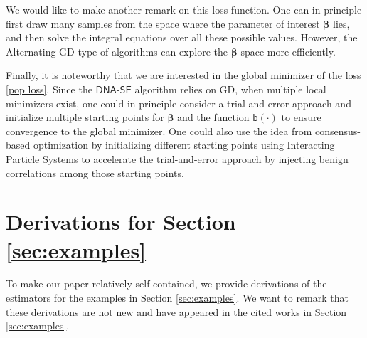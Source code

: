 \documentclass{article}
\def\dnase{{\mathsf{DNA\mbox{-}SE}}}
\def\sfb{\mathsf{b}}
\def\sfb{\mathsf{b}}
\theoremstyle{plain}
\theoremstyle{definition}
\theoremstyle{remark}
\def\bbeta{\boldsymbol{\beta}}
\begin{document}
We would like to make another remark on this loss function. One can in principle first draw many samples from the space where the parameter of interest $\bbeta$ lies, and then solve the integral equations over all these possible values. However, the Alternating GD type of algorithms can explore the $\bbeta$ space more efficiently.

Finally, it is noteworthy that we are interested in the global minimizer of the loss \eqref{pop loss}. Since the $\dnase$ algorithm relies on GD, when multiple local minimizers exist, one could in principle consider a trial-and-error approach and initialize multiple starting points for $\bbeta$ and the function $\sfb(\cdot)$ to ensure convergence to the global minimizer. One could also use the idea from consensus-based optimization \citep{carrillo2021consensus} by initializing different starting points using Interacting Particle Systems to accelerate the trial-and-error approach by injecting benign correlations among those starting points.

\section{Derivations for Section \ref{sec:examples}}

To make our paper relatively self-contained, we provide derivations of the estimators for the examples in Section \ref{sec:examples}. We want to remark that these derivations are not new and have appeared in the cited works in Section \ref{sec:examples}.
\end{document}

